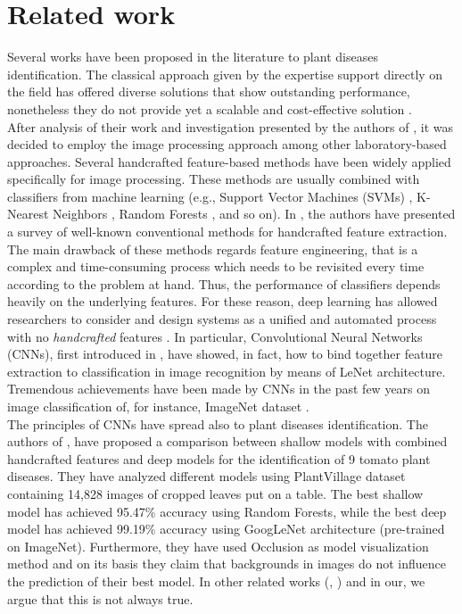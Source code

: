 \section{Related work}
Several works have been proposed in the literature to plant diseases identification. The classical approach given by the expertise support directly on the field has offered diverse solutions that show outstanding performance, nonetheless they do not provide yet a scalable and cost-effective solution \cite{ref17}.
\\\indent
After analysis of their work and investigation presented by the authors of \cite{ref18, ref19}, it was decided to employ the image processing approach among other laboratory-based approaches. Several handcrafted feature-based methods have been widely applied specifically for image processing. These methods are usually combined with classifiers from machine learning (e.g., Support Vector Machines (SVMs) \cite{ref24}, K-Nearest Neighbors \cite{ref27}, Random Forests \cite{ref25}, and so on). In \cite{ref28}, the authors have presented a survey of well-known conventional methods for handcrafted feature extraction.
\\\indent
The main drawback of these methods regards feature engineering, that is a complex and time-consuming process which needs to be revisited every time according to the problem at hand. Thus, the performance of classifiers depends heavily on the underlying features. For these reason, deep learning has allowed researchers to consider and design systems as a unified and automated process with no \emph{handcrafted} features \cite{ref29}. In particular, Convolutional Neural Networks (CNNs), first introduced in \cite{ref30}, have showed, in fact, how to bind together feature extraction to classification in image recognition by means of LeNet architecture. Tremendous achievements have been made by CNNs in the past few years on image classification of, for instance, ImageNet dataset \cite{Krizhevsky}.
\\\indent
The principles of CNNs have spread also to plant diseases identification. The authors of \cite{tunisia}, have proposed a comparison between shallow models with combined handcrafted features and deep models for the identification of 9 tomato plant diseases. They have analyzed different models using PlantVillage dataset containing 14,828 images of cropped leaves put on a table. The best shallow model has achieved 95.47\% accuracy using Random Forests, while the best deep model has achieved 99.19\% accuracy using GoogLeNet architecture (pre-trained on ImageNet). Furthermore, they have used Occlusion \cite{occlusion} as model visualization method and on its basis they claim that backgrounds in images do not influence the prediction of their best model. In other related works (\cite{manzoni}, \cite{erba}) and in our, we argue that this is not always true.
